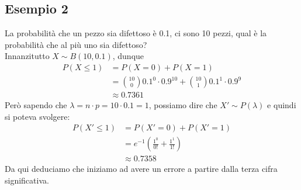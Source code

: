 \documentclass[11pt]{report}
\begin{document}
\subsection{Esempio 2}
La probabilità che un pezzo sia difettoso è 0.1, ci sono 10 pezzi, qual è la probabilità che al più uno sia difettoso?\\
Innanzitutto $X \sim B(10,0.1)$, dunque
\begin{equation}
    \begin{split}
        P(X \leq 1) & = P(X=0) + P(X=1)\\
        & = \binom{10}{0} 0.1^0 \cdot 0.9^{10} + \binom{10}{1} 0.1^1 \cdot 0.9^9\\
        & \approx 0.7361
    \end{split}
\end{equation}
Però sapendo che $\lambda = n \cdot p = 10 \cdot 0.1 = 1$, possiamo dire che $X' \sim P(\lambda)$ e quindi si poteva svolgere:
\begin{equation}
    \begin{split}
        P(X' \leq 1) & = P(X'=0) + P(X'=1)\\
        & = e^{-1} \left( \frac{1^0}{0!} + \frac{1^1}{1!} \right)\\
        & \approx 0.7358
    \end{split}
\end{equation}
Da qui deduciamo che iniziamo ad avere un errore a partire dalla terza cifra significativa.
\end{document}
